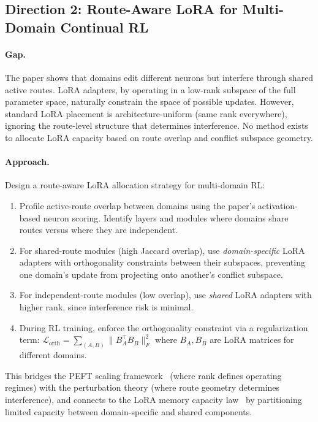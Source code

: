 \documentclass[11pt,a4paper]{article}
\begin{document}
\subsection{Direction 2: Route-Aware LoRA for Multi-Domain Continual RL}

\paragraph{Gap.} The paper shows that domains edit different neurons but interfere through shared active routes. LoRA adapters, by operating in a low-rank subspace of the full parameter space, naturally constrain the space of possible updates. However, standard LoRA placement is architecture-uniform (same rank everywhere), ignoring the route-level structure that determines interference. No method exists to allocate LoRA capacity based on route overlap and conflict subspace geometry.

\paragraph{Approach.} Design a route-aware LoRA allocation strategy for multi-domain RL:
\begin{enumerate}
\item Profile active-route overlap between domains using the paper's activation-based neuron scoring. Identify layers and modules where domains share routes versus where they are independent.
\item For shared-route modules (high Jaccard overlap), use \emph{domain-specific} LoRA adapters with orthogonality constraints between their subspaces, preventing one domain's update from projecting onto another's conflict subspace.
\item For independent-route modules (low overlap), use \emph{shared} LoRA adapters with higher rank, since interference risk is minimal.
\item During RL training, enforce the orthogonality constraint via a regularization term: $\mathcal{L}_{\mathrm{orth}} = \sum_{(A,B)} \|B_A^\top B_B\|_F^2$ where $B_A, B_B$ are LoRA matrices for different domains.
\end{enumerate}
This bridges the PEFT scaling framework~\cite{mindlab2026peft} (where rank defines operating regimes) with the perturbation theory (where route geometry determines interference), and connects to the LoRA memory capacity law~\cite{xu2026lora} by partitioning limited capacity between domain-specific and shared components.
\end{document}
